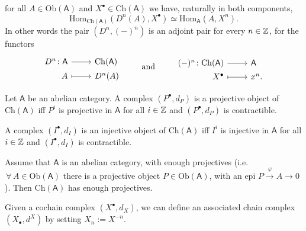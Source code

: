 \begin{lem}
	for all $A \in \mathrm{Ob} \left(\mathsf{A}\right)$ and $X^\bullet \in \mathrm{Ch}(\mathsf{A})$ we have,
	naturally in both components,
	\begin{equation}
		\mathrm{Hom}_{\mathrm{Ch}(\mathsf{A})} \left( D^n(A), X^\bullet \right) \simeq
		\mathrm{Hom}_{\mathsf{A}} \left( A, X^n \right)
	.\end{equation} 
	In other words the pair $(D^n, (-)^n)$ is an adjoint pair for every $n \in \mathbb{Z}$, for the functors
	\begin{equation*}
	\begin{tikzcd}[row sep = 0ex
		,/tikz/column 1/.append style={anchor=base east}
		,/tikz/column 2/.append style={anchor=base west}]
		D^n\colon \mathsf{A} \arrow[r, "", rightarrow] &
		\mathrm{Ch}(\mathsf{A}) \\
		A \arrow[r, "", mapsto] & D^n(A)
	\end{tikzcd}
	\qquad \text{ and } \qquad
	\begin{tikzcd}[row sep = 0ex
		,/tikz/column 1/.append style={anchor=base east}
		,/tikz/column 2/.append style={anchor=base west}]
		(-)^n\colon \mathrm{Ch}(\mathsf{A}) \arrow[r, "", rightarrow] &
		\mathsf{A} \\
		X^\bullet \arrow[r, "", mapsto] & x^n
	.\end{tikzcd}
	\end{equation*} 
\end{lem} 

\begin{prop}
	Let $\mathsf{A}$ be an abelian category.
	A complex $\left( P^{\bullet}, d_{P} \right)$ is a projective object of
	$\mathrm{Ch}(\mathsf{A})$ iff $P^i$ is projective in $\mathsf{A}$ for all
	$i \in \mathbb{Z}$ and $\left( P^{\bullet}, d_{P} \right)$ is contractible.

	A complex $\left( I^{\bullet}, d_{I} \right)$ is an injective object of
	$\mathrm{Ch}(\mathsf{A})$ iff $I^i$ is injective in $\mathsf{A}$ for all
	$i \in \mathbb{Z}$ and $\left( I^{\bullet}, d_{I} \right)$ is contractible.
\end{prop} 

\begin{lem}
	Assume that $\mathsf{A}$ is an abelian category, with enough
	projectives (i.e. $\,\forall\, A \in \mathrm{Ob} \left(\mathsf{A}\right)$ there is a
	projective object $P \in \mathrm{Ob} \left(\mathsf{A}\right)$, with an epi
	$P \xrightarrow{\varphi} A \to 0$).
	Then $\mathrm{Ch}(\mathsf{A})$ has enough projectives.
\end{lem} 

\begin{rem}[]
	Given a cochain complex $\left( X^{\bullet}, d_{X} \right)$, we can define an associated
	chain complex $\left( X_{\bullet}, d^{X} \right)$ by setting $X_n := X^{-n}$.
\end{rem}
